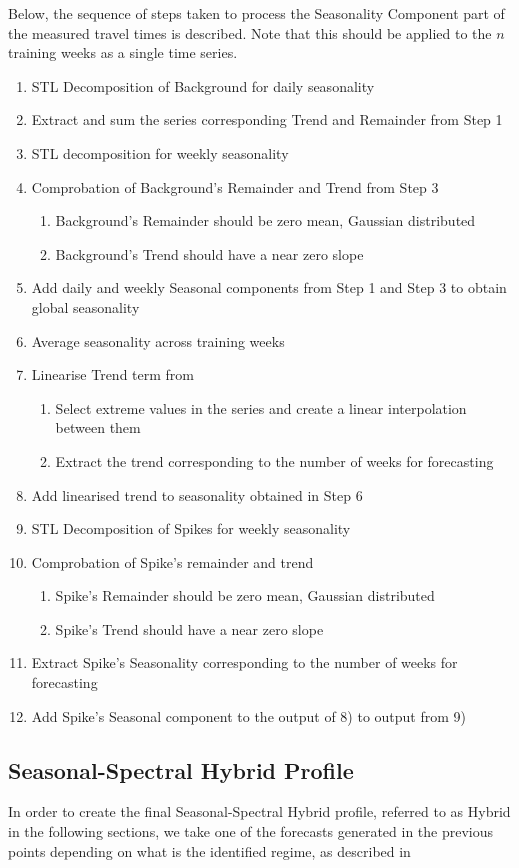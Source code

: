 \documentclass[conference]{IEEEtran}
\begin{document}
Below, the sequence of steps taken to process the Seasonality Component part of the measured travel times is described. 
Note that this should be applied to the $n$ training weeks as a single time series.
\begin{enumerate}
	\item STL Decomposition of Background for daily seasonality
	\item Extract and sum the series corresponding Trend and Remainder from Step 1
	\item STL decomposition for weekly seasonality
	\item Comprobation of Background's Remainder and Trend from Step 3
	\begin{enumerate}
		\item Background's Remainder should be zero mean, Gaussian distributed
		\item Background's Trend should have a near zero slope
	\end{enumerate}
	\item Add daily and weekly Seasonal components from Step 1 and Step 3 to obtain global seasonality
	\item Average seasonality across training weeks
	\item Linearise Trend term from
	\begin{enumerate}
		\item Select extreme values in the series and create a linear interpolation between them
		\item Extract the trend corresponding to the number of weeks for forecasting
	\end{enumerate}
	\item Add linearised trend to seasonality obtained in Step 6
	\item STL Decomposition of Spikes for weekly seasonality
	\item Comprobation of Spike's remainder and trend
	\begin{enumerate}
		\item Spike's Remainder should be zero mean, Gaussian distributed
		\item Spike's Trend should have a near zero slope
	\end{enumerate}
	\item Extract Spike's Seasonality corresponding to the number of weeks for forecasting
	\item Add Spike's Seasonal component to the output of 8) to output from 9)
\end{enumerate}
\subsection{Seasonal-Spectral Hybrid Profile}
In order to create the final Seasonal-Spectral Hybrid profile, referred to as Hybrid in the following sections, we take one of the forecasts generated in the previous points depending on what is the identified regime, as described in 
\end{document}
